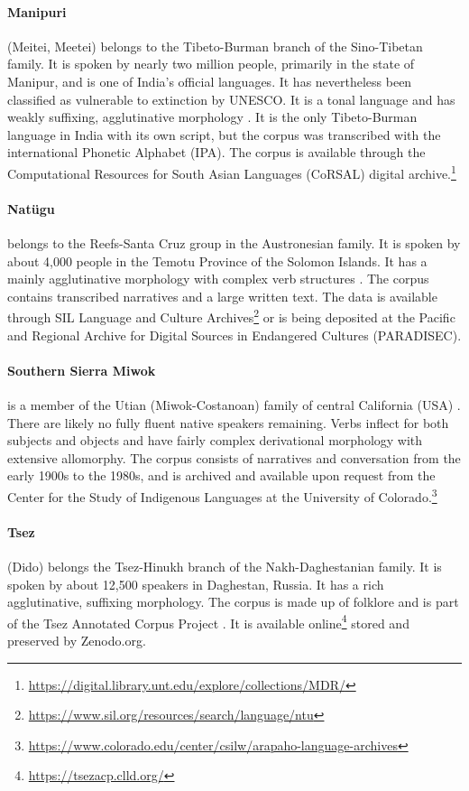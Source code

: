 \paragraph{Manipuri} 
(Meitei, Meetei) belongs to the Tibeto-Burman branch of the Sino-Tibetan family. It is spoken by nearly two million people, primarily in the state of Manipur, and is one of India's official languages. It has nevertheless been classified as vulnerable to extinction by UNESCO. It is a tonal language and has weakly suffixing, agglutinative morphology \citep{Chelliah-1997}. It is the only Tibeto-Burman language in India with its own script, but the corpus was transcribed with the international Phonetic Alphabet (IPA). The corpus is available through the Computational Resources for South Asian Languages (CoRSAL) digital archive.\footnote{\url{https://digital.library.unt.edu/explore/collections/MDR/}}

\paragraph{Natügu}
belongs to the Reefs-Santa Cruz group in the Austronesian family. It is spoken by about 4,000 people in the Temotu Province of the Solomon Islands. It has a mainly agglutinative morphology with complex verb structures \citep{naess_ntu_2008}. The corpus contains transcribed narratives and a large written text. The data is available through SIL Language and Culture Archives\footnote{\url{https://www.sil.org/resources/search/language/ntu}} or is being deposited at the Pacific and Regional Archive for Digital Sources in Endangered Cultures (PARADISEC).

\paragraph{Southern Sierra Miwok} 
is a member of the Utian (Miwok-Costanoan) family of central California (USA) \citep{broadbent_southern_1964}. There are likely no fully fluent native speakers remaining. Verbs inflect for both subjects and objects and have fairly complex derivational morphology with extensive allomorphy. The corpus consists of narratives and conversation from the early 1900s to the 1980s, and is archived and available upon request from the Center for the Study of Indigenous Languages at the University of Colorado.\footnote{\url{https://www.colorado.edu/center/csilw/arapaho-language-archives}}

\paragraph{Tsez}
(Dido) belongs the Tsez-Hinukh branch of the Nakh-Daghestanian family. It is spoken by about 12,500 speakers in Daghestan, Russia. It has a rich agglutinative, suffixing morphology. The corpus is made up of folklore and is part of the Tsez Annotated Corpus Project \citep{abdulaev-tsezcorpus-2010}. It is available online\footnote{\url{https://tsezacp.clld.org/}} stored and preserved by Zenodo.org.

